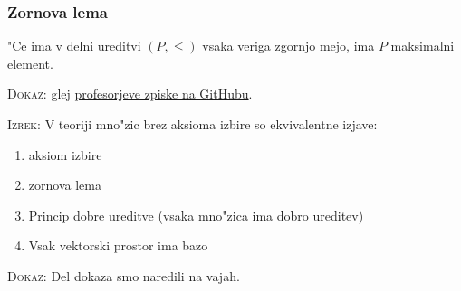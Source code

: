 \subsubsection{Zornova lema}
"Ce ima v delni ureditvi $(P, \leq)$ vsaka veriga zgornjo mejo, ima $P$ maksimalni element.

\textsc{Dokaz:} glej \href{https://github.com/andrejbauer/ucbenik-logika-in-mnozice}{profesorjeve zpiske na GitHubu}.

\textsc{Izrek:} V teoriji mno"zic brez aksioma izbire so ekvivalentne izjave:
\begin{enumerate}
	\item aksiom izbire
	\item zornova lema
	\item Princip dobre ureditve (vsaka mno"zica ima dobro ureditev)
	\item Vsak vektorski prostor ima bazo
\end{enumerate}
\textsc{Dokaz:} Del dokaza smo naredili na vajah.